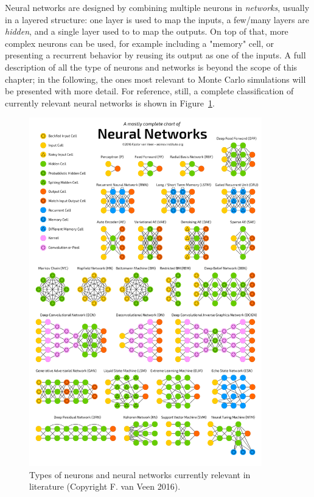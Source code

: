 Neural networks are designed by combining multiple neurons in \emph{networks}, usually in a layered structure: one layer is used to map the inputs, a few/many layers are \emph{hidden}, and a single layer used to to map the outputs. On top of that, more complex neurons can be used, for example including a "memory" cell, or presenting a recurrent behavior by reusing its output as one of the inputs. A full description of all the type of neurons and networks is beyond the scope of this chapter; in the following, the ones most relevant to Monte Carlo simulations will be presented with more detail. For reference, still, a complete classification of currently relevant neural networks is shown in Figure~\ref{fig:types}.
\begin{figure}[h]
    \centering
    \includegraphics[width=0.9\textwidth]{images/types.png}
    \caption{Types of neurons and neural networks currently relevant in literature (Copyright F. van Veen 2016).}
    \label{fig:types}
\end{figure}

